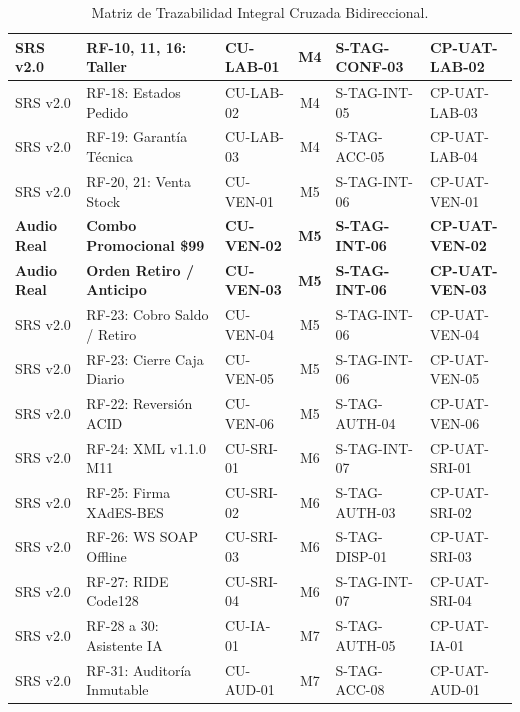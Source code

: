 \documentclass[12pt,a4paper]{report}
\begin{document}
\begin{table}[H]
\begin{tabularx}{\textwidth}{|L{2.2cm}|L{3.2cm}|L{2.3cm}|c|L{2.3cm}|L{2.5cm}|}
\hline
SRS v2.0 & RF-10, 11, 16: Taller & CU-LAB-01 & M4 & S-TAG-CONF-03 & CP-UAT-LAB-02 \\
\hline
SRS v2.0 & RF-18: Estados Pedido & CU-LAB-02 & M4 & S-TAG-INT-05 & CP-UAT-LAB-03 \\
\hline
SRS v2.0 & RF-19: Garantía Técnica & CU-LAB-03 & M4 & S-TAG-ACC-05 & CP-UAT-LAB-04 \\
\hline
SRS v2.0 & RF-20, 21: Venta Stock & CU-VEN-01 & M5 & S-TAG-INT-06 & CP-UAT-VEN-01 \\
\hline
{}\textbf{Audio Real} & \textbf{Combo Promocional \$99} & \textbf{CU-VEN-02} & \textbf{M5} & \textbf{S-TAG-INT-06} & \textbf{CP-UAT-VEN-02} \\
\hline
{}\textbf{Audio Real} & \textbf{Orden Retiro / Anticipo} & \textbf{CU-VEN-03} & \textbf{M5} & \textbf{S-TAG-INT-06} & \textbf{CP-UAT-VEN-03} \\
\hline
SRS v2.0 & RF-23: Cobro Saldo / Retiro & CU-VEN-04 & M5 & S-TAG-INT-06 & CP-UAT-VEN-04 \\
\hline
SRS v2.0 & RF-23: Cierre Caja Diario & CU-VEN-05 & M5 & S-TAG-INT-06 & CP-UAT-VEN-05 \\
\hline
SRS v2.0 & RF-22: Reversión ACID & CU-VEN-06 & M5 & S-TAG-AUTH-04 & CP-UAT-VEN-06 \\
\hline
SRS v2.0 & RF-24: XML v1.1.0 M11 & CU-SRI-01 & M6 & S-TAG-INT-07 & CP-UAT-SRI-01 \\
\hline
SRS v2.0 & RF-25: Firma XAdES-BES & CU-SRI-02 & M6 & S-TAG-AUTH-03 & CP-UAT-SRI-02 \\
\hline
SRS v2.0 & RF-26: WS SOAP Offline & CU-SRI-03 & M6 & S-TAG-DISP-01 & CP-UAT-SRI-03 \\
\hline
SRS v2.0 & RF-27: RIDE Code128 & CU-SRI-04 & M6 & S-TAG-INT-07 & CP-UAT-SRI-04 \\
\hline
SRS v2.0 & RF-28 a 30: Asistente IA & CU-IA-01 & M7 & S-TAG-AUTH-05 & CP-UAT-IA-01 \\
\hline
SRS v2.0 & RF-31: Auditoría Inmutable & CU-AUD-01 & M7 & S-TAG-ACC-08 & CP-UAT-AUD-01 \\
\hline
\end{tabularx}
\caption{Matriz de Trazabilidad Integral Cruzada Bidireccional.}
\label{tab:matriz_trazabilidad}
\end{table}
\end{document}
